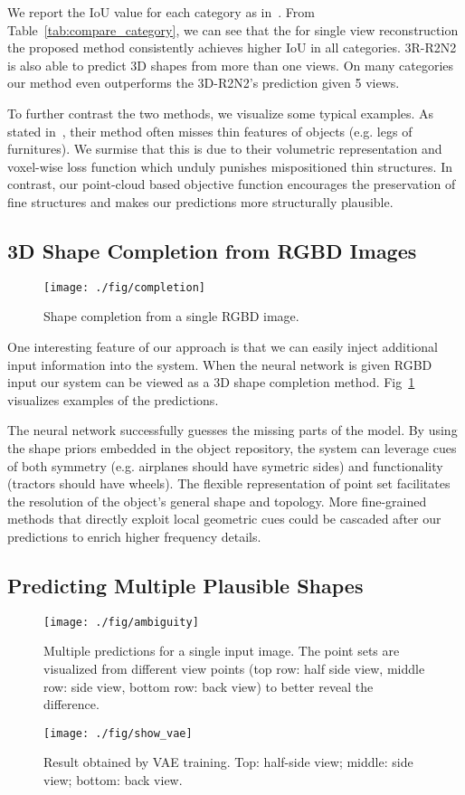 \documentclass[10pt,twocolumn,letterpaper]{article}
\begin{document}
We report the IoU value for each category as in~\cite{choy20163d}. From Table~\ref{tab:compare_category},
we can see that the for single view reconstruction the proposed method consistently achieves higher IoU in all categories. 3R-R2N2 is also able to predict 3D shapes from more than one views. On many categories our method even outperforms the 3D-R2N2's prediction given 5 views.

To further contrast the two methods, we visualize some typical examples. As stated in~\cite{choy20163d}, their method often misses thin features of objects (e.g. legs of furnitures). We surmise that this is due to their volumetric representation and voxel-wise loss function which unduly punishes mispositioned thin structures. In contrast, our point-cloud based objective function encourages the preservation of fine structures and makes our predictions more structurally plausible.

\subsection{3D Shape Completion from RGBD Images}\label{sec:exp:depth}\begin{figure}[th!]
  \centering
  \texttt{[image: ./fig/completion]}
  \caption{Shape completion from a single RGBD image.}\label{fig:shape_completion}
\end{figure}
One interesting feature of our approach is that we can easily inject additional input information into the system. When the neural network is given RGBD input our system can be viewed as a 3D shape completion method. Fig~\ref{fig:shape_completion} visualizes examples of the predictions.

The neural network successfully guesses the missing parts of the model. By using the shape priors embedded in the object repository, the system can leverage cues of both symmetry (e.g. airplanes should have symetric sides) and functionality (tractors should have wheels). The flexible representation of point set facilitates the resolution of the object's general shape and topology. More fine-grained methods that directly exploit local geometric cues could be cascaded after our predictions to enrich higher frequency details.

\subsection{Predicting Multiple Plausible Shapes}\label{sec:exp:gan}\begin{figure}[t!]
  \centering
  \texttt{[image: ./fig/ambiguity]}
  \caption{Multiple predictions for a single input image. The point sets are visualized from different view points (top row: half side view, middle row: side view, bottom row: back view) to better reveal the difference.}\label{fig:deformation}
\end{figure}\begin{figure}
\centering
\texttt{[image: ./fig/show\_vae]}
\caption{Result obtained by VAE training. Top: half-side view; middle: side view; bottom: back view.}
\label{fig:show_vae}
\end{figure}
\end{document}
